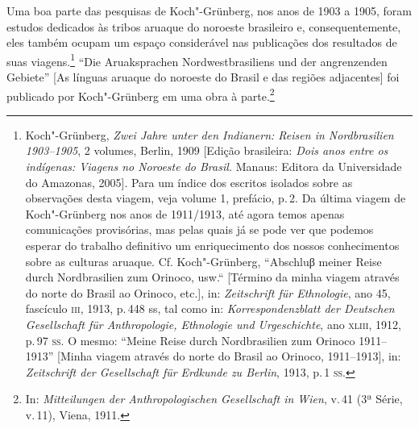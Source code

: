 Uma boa parte das pesquisas de Koch"-Grünberg, nos anos de 1903 a 1905,
foram estudos dedicados às tribos aruaque do noroeste brasileiro e,
consequentemente, eles também ocupam um espaço considerável nas
publicações dos resultados de suas viagens.\footnote{Koch"-Grünberg,
  \textit{Zwei Jahre unter den Indianern: Reisen in Nordbrasilien
  1903--1905}, 2 volumes, Berlin, 1909 {[}Edição brasileira: \textit{Dois
  anos entre os indígenas: Viagens no Noroeste do Brasil.} Manaus:
  Editora da Universidade do Amazonas, 2005{]}. Para um índice dos
  escritos isolados sobre as observações desta viagem, veja volume 1,
  prefácio, p.\,2. Da última viagem de Koch"-Grünberg nos anos de
  1911/1913, até agora temos apenas comunicações provisórias, mas pelas
  quais já se pode ver que podemos esperar do trabalho definitivo um
  enriquecimento dos nossos conhecimentos sobre as culturas aruaque. Cf.
  Koch"-Grünberg, ``Abschluβ meiner Reise durch Nordbrasilien zum
  Orinoco, usw.`` {[}Término da minha viagem através do norte do Brasil
  ao Orinoco, etc.{]}, in: \textit{Zeitschrift für Ethnologie}, ano 45,
  fascículo \textsc{iii}, 1913, p.\,448 ss, tal como in: \textit{Korrespondenzblatt
  der Deutschen Gesellschaft für Anthropologie, Ethnologie und
  Urgeschichte}, ano \textsc{xliii}, 1912, p.\,97 \textsc{ss}. O mesmo: ``Meine Reise durch
  Nordbrasilien zum Orinoco 1911--1913'' {[}Minha viagem através do norte
  do Brasil ao Orinoco, 1911--1913{]}, in: \textit{Zeitschrift der
  Gesellschaft für Erdkunde zu Berlin}, 1913, p.\,1 \textsc{ss}.} ``Die
Aruaksprachen Nordwestbrasiliens und der angrenzenden Gebiete'' {[}As
línguas aruaque do noroeste do Brasil e das regiões adjacentes{]} foi
publicado por Koch"-Grünberg em uma obra à parte.\footnote{In:
  \textit{Mitteilungen der Anthropologischen Gesellschaft in Wien}, v.\,41
  (3ª Série, v.\,11), Viena, 1911.}

